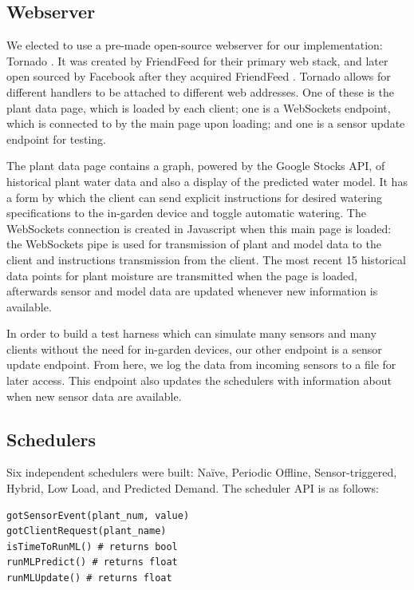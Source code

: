 \documentclass[a4paper]{acm_proc_article-sp}
\makeatletter
\newcommand{\Naive}{Na\"{i}ve\@\xspace}
\makeatother
\begin{document}
\subsection{Webserver}

We elected to use a pre-made open-source webserver for our implementation: Tornado \cite{Tornado}.  It was created by FriendFeed for their primary web stack, and later open sourced by Facebook after they acquired FriendFeed \cite{TornadoAnnounce}.  Tornado allows for different handlers to be attached to different web addresses.  One of these is the plant data page, which is loaded by each client; one is a WebSockets endpoint, which is connected to by the main page upon loading; and one is a sensor update endpoint for testing.

The plant data page contains a graph, powered by the Google Stocks API, of historical plant water data and also a display of the predicted water model.  It has a form by which the client can send explicit instructions for desired watering specifications to the in-garden device and toggle automatic watering.  The WebSockets connection is created in Javascript when this main page is loaded: the WebSockets pipe is used for transmission of plant and model data to the client and instructions transmission from the client.  The most recent 15 historical data points for plant moisture are transmitted when the page is loaded, afterwards sensor and model data are updated whenever new information is available.

In order to build a test harness which can simulate many sensors and many clients without the need for in-garden devices, our other endpoint is a sensor update endpoint.  From here, we log the data from incoming sensors to a file for later access.  This endpoint also updates the schedulers with information about when new sensor data are available.

\subsection{Schedulers}

Six independent schedulers were built: \Naive, Periodic Offline, Sensor-triggered, Hybrid, Low Load, and Predicted Demand.  The scheduler API is as follows:

\begin{lstlisting}
gotSensorEvent(plant_num, value)
gotClientRequest(plant_name)
isTimeToRunML() # returns bool
runMLPredict() # returns float
runMLUpdate() # returns float
\end{lstlisting}
\end{document}
